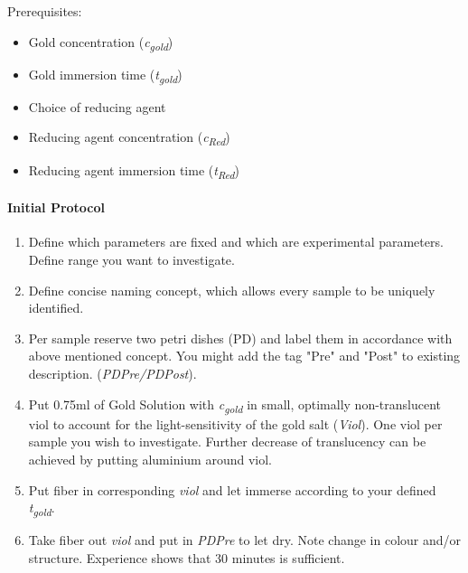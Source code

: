 \begin{appendices}
Prerequisites: \hfill\newline

\begin{multicols}{2}
	\begin{itemize}
		\item Gold concentration (\textit{c\textsubscript{gold}})
		\item Gold immersion time (\textit{t\textsubscript{gold}})
		\item Choice of reducing agent
		\item Reducing agent concentration (\textit{c\textsubscript{Red}})
		\item Reducing agent immersion time (\textit{t\textsubscript{Red}})
	\end{itemize}
\end{multicols}

\paragraph{Initial Protocol}

\begin{enumerate}
	\item Define which parameters are fixed and which are experimental parameters. Define range you want to investigate.
	
	\item Define concise naming concept, which allows every sample to be uniquely identified.
	
	\item Per sample reserve two petri dishes (PD) and label them in accordance with above mentioned concept. You might add the tag "Pre" and "Post" to existing description. (\textit{PDPre/PDPost}).
	
	\item Put 0.75ml of Gold Solution with \textit{c\textsubscript{gold}} in small, optimally non-translucent viol to account for the light-sensitivity of the gold salt (\textit{Viol}). One viol per sample you wish to investigate. Further decrease of translucency can be achieved by putting aluminium around viol.
	
	\item Put fiber in corresponding \textit{viol} and let immerse according to your defined \textit{t\textsubscript{gold}}.
	\item Take fiber out \textit{viol} and put in \textit{PDPre} to let dry. Note change in colour and/or structure. Experience shows that 30 minutes is sufficient.
	

\end{enumerate}
\end{appendices}
